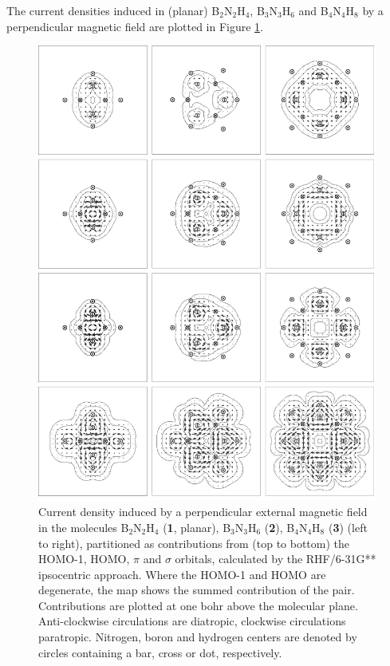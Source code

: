 The current densities induced in (planar) B$_2$N$_2$H$_4$, B$_3$N$_3$H$_6$ and B$_4$N$_4$H$_8$ by a perpendicular magnetic field are plotted in Figure \ref{ch5.fig.f04}.
\begin{figure}[htp]
\begin{center}
\includegraphics{huckel/figures/fig4.eps}
\end{center}
\caption{Current density induced by a perpendicular external magnetic field in the molecules B$_2$N$_2$H$_4$ (\textbf{1}, planar), B$_3$N$_3$H$_6$ (\textbf{2}), B$_4$N$_4$H$_8$ (\textbf{3}) (left to
right), partitioned as contributions from (top to bottom) the \mbox{HOMO-1}, HOMO, $\pi$ and $\sigma$ orbitals, calculated by the RHF/6-31G** ipsocentric approach. Where the \mbox{HOMO-1} and HOMO are degenerate, the map shows the summed contribution of the pair. Contributions are plotted at one bohr above the molecular plane. Anti-clockwise circulations are
diatropic, clockwise circulations paratropic. Nitrogen, boron and hydrogen centers are denoted by circles containing a bar, cross or dot, respectively.}
\label{ch5.fig.f04}
\end{figure}
